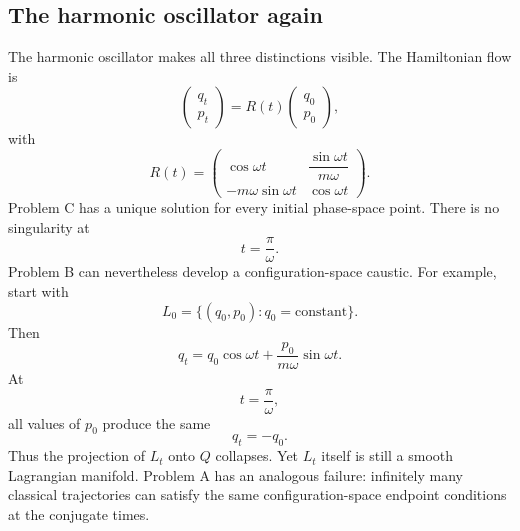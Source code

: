 \subsection{The harmonic oscillator again}
The harmonic oscillator makes all three distinctions visible.
The Hamiltonian flow is
\begin{equation}
\begin{pmatrix}
q_t\\p_t
\end{pmatrix}
=
R(t)
\begin{pmatrix}
q_0\\p_0
\end{pmatrix},
\end{equation}
with
\begin{equation}
R(t)=
\begin{pmatrix}
\cos\omega t&
\dfrac{\sin\omega t}{m\omega}\\
-m\omega\sin\omega t&
\cos\omega t
\end{pmatrix}.
\end{equation}
Problem C has a unique solution for every initial phase-space point.
There is no singularity at
\begin{equation}
t=\frac{\pi}{\omega}.
\end{equation}
Problem B can nevertheless develop a configuration-space caustic.
For example, start with
\begin{equation}
L_0=\{(q_0,p_0):q_0=\text{constant}\}.
\end{equation}
Then
\begin{equation}
q_t=q_0\cos\omega t
+\frac{p_0}{m\omega}\sin\omega t.
\end{equation}
At
\begin{equation}
t=\frac{\pi}{\omega},
\end{equation}
all values of \(p_0\) produce the same
\begin{equation}
q_t=-q_0.
\end{equation}
Thus the projection of \(L_t\) onto \(Q\) collapses.
Yet \(L_t\) itself is still a smooth Lagrangian manifold.
Problem A has an analogous failure: infinitely many classical trajectories
can satisfy the same configuration-space endpoint conditions at the
conjugate times.
